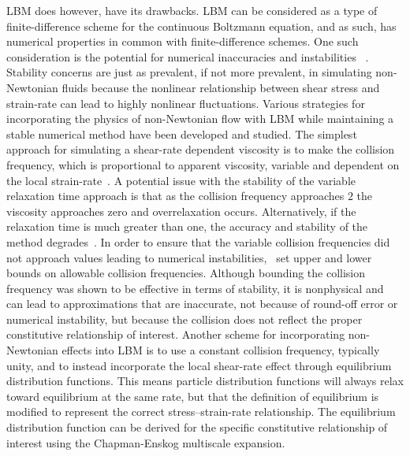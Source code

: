 LBM does however, have its drawbacks.
LBM can be considered as a type of finite-difference scheme for the continuous Boltzmann equation, and as such, has numerical properties in common with finite-difference schemes.
One such consideration is the potential for numerical inaccuracies and instabilities ~\cite{sterling1993stability,sterling1996stability,bawazeer2013stability,lallemand2000theory}.
Stability concerns are just as prevalent, if not more prevalent, in simulating non-Newtonian fluids because the nonlinear relationship between shear stress and strain-rate can lead to highly nonlinear fluctuations.
Various strategies for incorporating the physics of non-Newtonian flow with LBM while maintaining a stable numerical method have been developed and studied.
The simplest approach for simulating a shear-rate dependent viscosity is to make the collision frequency, which is proportional to apparent viscosity, variable and dependent on the local strain-rate~\cite{boyd2006second,chen2014simulations,fallah2012multiple,tang2011bingham,svec2011flow,svec2012free,zhao2016lattice}.
A potential issue with the stability of the variable relaxation time approach is that as the collision frequency approaches $2$ the viscosity approaches zero and overrelaxation occurs.
Alternatively, if the relaxation time is much greater than one, the accuracy and stability of the method degrades~\cite{latt2007hydrodynamic}. 
In order to ensure that the variable collision frequencies did not approach values leading to numerical instabilities,~\cite{svec2011flow,svec2012free,gabbanelli2005lattice} set upper and lower bounds on allowable collision frequencies.
Although bounding the collision frequency was shown to be effective in terms of stability, it is nonphysical and can lead to approximations that are inaccurate, not because of round-off error or numerical instability, but because the collision does not reflect the proper constitutive relationship of interest.
Another scheme for incorporating non-Newtonian effects into LBM is to use a constant collision frequency, typically unity, and to instead incorporate the local shear-rate effect through equilibrium distribution functions.
This means particle distribution functions will always relax toward equilibrium at the same rate, but that the definition of equilibrium is modified to represent the correct stress--strain-rate relationship.
The equilibrium distribution function can be derived for the specific constitutive relationship of interest using the Chapman-Enskog multiscale expansion.
